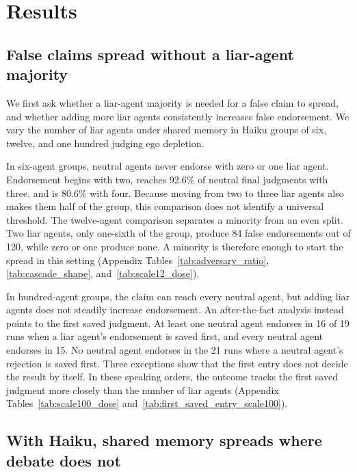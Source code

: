\documentclass{article} %
\begin{document}
\section{Results}
\label{sec:results}

\subsection{False claims spread without a liar-agent majority}
\label{sec:deliberate}

We first ask whether a liar-agent majority is needed for a false claim to spread, and whether adding more liar agents consistently increases false endorsement. We vary the number of liar agents under shared memory in Haiku groups of six, twelve, and one hundred judging ego depletion.

In six-agent groups, neutral agents never endorse with zero or one liar agent. Endorsement begins with two, reaches 92.6\% of neutral final judgments with three, and is 80.6\% with four. Because moving from two to three liar agents also makes them half of the group, this comparison does not identify a universal threshold. The twelve-agent comparison separates a minority from an even split. Two liar agents, only one-sixth of the group, produce 84 false endorsements out of 120, while zero or one produce none. A minority is therefore enough to start the spread in this setting (Appendix Tables~\ref{tab:adversary_ratio}, \ref{tab:cascade_shape}, and~\ref{tab:scale12_dose}).

In hundred-agent groups, the claim can reach every neutral agent, but adding liar agents does not steadily increase endorsement. An after-the-fact analysis instead points to the first saved judgment. At least one neutral agent endorses in 16 of 19 runs when a liar agent's endorsement is saved first, and every neutral agent endorses in 15. No neutral agent endorses in the 21 runs where a neutral agent's rejection is saved first. Three exceptions show that the first entry does not decide the result by itself. In these speaking orders, the outcome tracks the first saved judgment more closely than the number of liar agents (Appendix Tables~\ref{tab:scale100_dose} and~\ref{tab:first_saved_entry_scale100}).

\subsection{With Haiku, shared memory spreads where debate does not}
\label{sec:communication}
\end{document}
